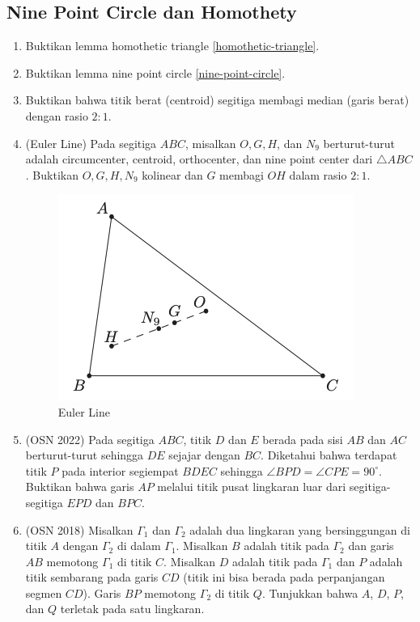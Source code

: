 \documentclass[11pt]{scrartcl}
\begin{document}
\subsection{Nine Point Circle dan Homothety}
\begin{enumerate}[resume]
    \item Buktikan lemma homothetic triangle \ref{homothetic-triangle}.
    \item Buktikan lemma nine point circle \ref{nine-point-circle}.
    \item Buktikan bahwa titik berat (centroid) segitiga membagi median (garis berat) dengan rasio $2:1$.
    \item (Euler Line) Pada segitiga $ABC$, misalkan $O,G,H$, dan $N_9$ berturut-turut adalah circumcenter, centroid, orthocenter, dan nine point center dari $\triangle ABC$. Buktikan $O,G,H, N_9$ kolinear dan $G$ membagi $OH$ dalam rasio $2:1$.
    \begin{figure}[h]
        \centering
        \includegraphics[scale=0.4]{Geometri/Symmedian-NinePoint/euler-line.png}
        \caption{Euler Line}
        \label{fig:euler-line}
    \end{figure}
    \item (OSN 2022) Pada segitiga $ABC$, titik $D$ dan $E$ berada pada sisi $AB$ dan $AC$ berturut-turut sehingga $DE$ sejajar dengan $BC$. Diketahui bahwa terdapat titik $P$ pada interior segiempat $BDEC$ sehingga $\angle BPD = \angle CPE = 90^{\circ}$. Buktikan bahwa garis $AP$ melalui titik pusat lingkaran luar dari segitiga-segitiga $EPD$ dan $BPC$.
    \item (OSN 2018) Misalkan $\Gamma_1$ dan $\Gamma_2$ adalah dua lingkaran yang bersinggungan di titik $A$ dengan $\Gamma_2$ di dalam $\Gamma_1$. Misalkan $B$ adalah titik pada $\Gamma_2$ dan garis $AB$ memotong $\Gamma_1$ di titik $C$. Misalkan $D$ adalah titik pada $\Gamma_1$ dan $P$ adalah titik sembarang pada garis $CD$ (titik ini bisa berada pada perpanjangan segmen $CD$). Garis $BP$ memotong $\Gamma_2$ di titik $Q$. Tunjukkan bahwa $A$, $D$, $P$, dan $Q$ terletak pada satu lingkaran.

\end{enumerate}
\end{document}
